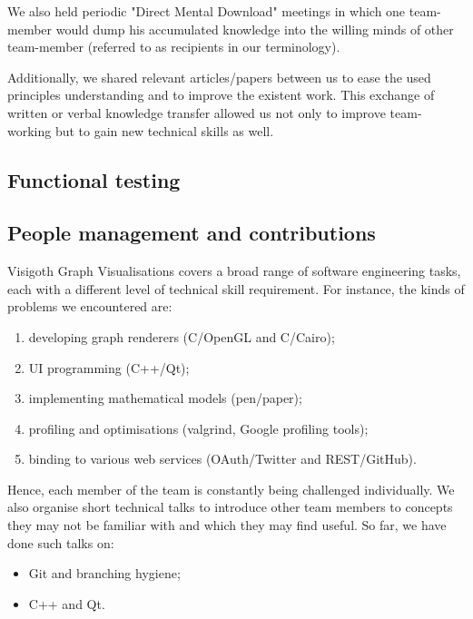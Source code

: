 \documentclass[a4paper,11pt,titlepage]{article}
\begin{document}
We also held periodic "Direct Mental Download" meetings in which one
team-member would dump his accumulated knowledge into the willing
minds of other team-member (referred to as recipients in our terminology).

Additionally, we shared relevant articles/papers between us to ease
the used principles understanding and to improve the existent work.
This exchange of written or verbal knowledge transfer allowed us not
only to improve team-working but to gain new technical skills as well.



\subsection{Functional testing}
\label{tests}




\subsection{People management and contributions}
Visigoth Graph Visualisations covers a broad range of software engineering tasks, each with a different level of technical skill requirement. For instance, the kinds of problems we encountered are:
\begin{enumerate}

\item developing graph renderers (C/OpenGL and C/Cairo);
\item UI programming (C++/Qt);
\item implementing mathematical models (pen/paper);
\item profiling and optimisations (valgrind, Google profiling tools);
\item binding to various web services (OAuth/Twitter and REST/GitHub).

\end{enumerate}

Hence, each member of the team is constantly being challenged individually. We also organise short technical talks to introduce other team members to concepts they may not be familiar with and which they may find useful. So far, we have done such talks on:

\begin{itemize}

\item Git and branching hygiene;
\item C++ and Qt.

\end{itemize}
\end{document}
